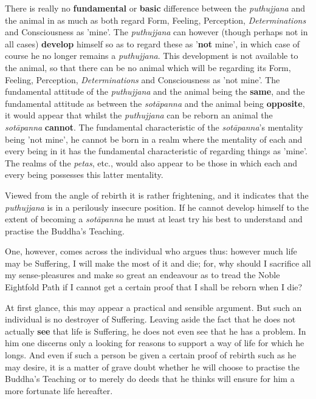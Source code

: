 There is really no \textbf{fundamental} or \textbf{basic} difference between the
\emph{puthujjana} and the animal in as much as both regard Form, Feeling,
Perception, \emph{Determinations} and Consciousness as 'mine'. The
\emph{puthujjana} can however (though perhaps not in all cases) \textbf{develop}
himself so as to regard these as '\textbf{not} mine', in which case of course
he no longer remains a \emph{puthujjana}. This development is not available
to the animal, so that there can be no animal which will be regarding
its Form, Feeling, Perception, \emph{Determinations} and Consciousness as
'not mine'. The fundamental attitude of the \emph{puthujjana} and the animal
being the \textbf{same}, and the fundamental attitude as between the
\emph{sotāpanna} and the animal being \textbf{opposite}, it would appear that
whilst the \emph{puthujjana} can be reborn an animal the \emph{sotāpanna}
\textbf{cannot}. The fundamental characteristic of the \emph{sotāpanna}'s
mentality being 'not mine', he cannot be born in a realm where the
mentality of each and every being in it has the fundamental
characteristic of regarding things as 'mine'. The realms of the
\emph{petas}, etc., would also appear to be those in which each and every
being possesses this latter mentality.


Viewed from the angle of rebirth it is rather frightening, and it
indicates that the \emph{puthujjana} is in a perilously insecure position. If
he cannot develop himself to the extent of becoming a \emph{sotāpanna} he
must at least try his best to understand and practise the Buddha’s
Teaching.


One, however, comes across the individual who argues thus: however much
life may be Suffering, I will make the most of it and die; for, why
should I sacrifice all my sense-pleasures and make so great an endeavour
as to tread the Noble Eightfold Path if I cannot get a certain proof
that I shall be reborn when I die?


At first glance, this may appear a practical and sensible argument. But
such an individual is no destroyer of Suffering. Leaving aside the fact
that he does not actually \textbf{see} that life is Suffering, he does not even
see that he has a problem. In him one discerns only a looking for
reasons to support a way of life for which he longs. And even if such a
person be given a certain proof of rebirth such as he may desire, it is
a matter of grave doubt whether he will choose to practise the Buddha’s
Teaching or to merely do deeds that he thinks will ensure for him a more
fortunate life hereafter.


